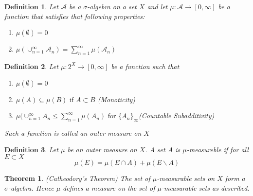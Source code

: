 \documentclass[12pt]{article}
\newtheorem{theorem}{Theorem}[section]
\newtheorem{definition}{Definition}[section]
\theoremstyle{remark}
\begin{document}
\begin{definition}
	Let $\mathcal{A}$ be a $\sigma$-algebra on a set $X$ and let $\mu: \mathcal{A} \rightarrow [0,\infty]$ be a 	function that satisfies that following properties:
	\begin{enumerate}
	\item $\mu(\emptyset) = 0$
	\item $\mu(\cup_{n = 1}^{\infty} \mathcal{A}_n) = \sum_{n = 1}^{\infty} \mu(\mathcal{A}_n)$
\end{enumerate}
\end{definition} 
\newpage

\begin{definition}
Let  $\mu:2^X \rightarrow [0,\infty]$ be a function such that 
\begin{enumerate}
	\item $\mu(\emptyset) = 0$
	\item $\mu(A) \subseteq \mu(B) \text{ if } A \subset B$ (Monoticity)
	\item $\mu(\cup_{n=1}^{\infty} A_n \leq \sum_{n=1}^{\infty} \mu(A_n) \text{ for } \{A_n\}_{\infty}$(Countable Subadditivity)
\end{enumerate}	

Such a function is called an outer measure on $X$
\end{definition}

\begin{definition}
Let $\mu$ be an outer measure on $X$. A set $A$ is $\mu$-measureble if for all $E \subset X$
$$ \mu(E) = \mu(E \cap A) + \mu(E\backslash A) $$
\end{definition}

\begin{theorem}(Catheodory's Theorem)
\label{cath}
The set of $\mu$-measurable sets on $X$ form a $\sigma$-algebra. Hence $\mu$ defines a measure on the set of $\mu$-measurable sets as described.
\end{theorem}
\end{document}
